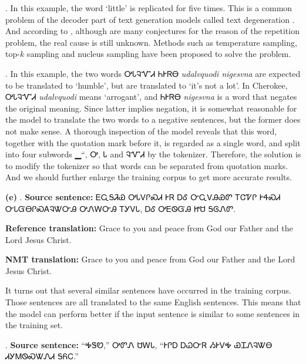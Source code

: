 \documentclass[a4paper,12pt]{report}
\newcommand{\cherokeefam}[1]{{\cherokeefama #1}}
\newcommand{\japanesefam}[1]{{\japanesefama #1}}
\newcommand{\rom}[1]{\expandafter{\romannumeral #1\relax}}
\begin{document}
\rom{2}. In this example, the word `little' is replicated for five times. This is a common problem of the decoder part of text generation models called text degeneration \cite{degeneration}. And according to \citeauthor{repitition} \cite{repitition}, although are many conjectures for the reason of the repetition problem, the real cause is still unknown. Methods such as temperature sampling, top-$k$ sampling and nucleus sampling have been proposed to solve the problem.

\rom{3}. In this example, the two words \cherokeefam{ᎤᏓᎸᏉᏗ ᏂᎨᏒᎾ} \textit{udalvquodi nigesvna} are expected to be translated to `humble', but are translated to `it's not a lot'. In Cherokee, \cherokeefam{ᎤᏓᎸᏉᏗ} \textit{udalvquodi} means `arrogant', and \cherokeefam{ᏂᎨᏒᎾ} \textit{nigesvna} is a word that negates the original meaning. Since latter implies negation, it is somewhat reasonable for the model to translate the two words to a negative sentences, but the former does not make sense. A thorough inspection of the model reveals that this word, together with the quotation mark before it, is regarded as a single word, and split into four subwords \japanesefam{▁}``, \cherokeefam{Ꭴ}, \cherokeefam{Ꮣ} and \cherokeefam{ᎸᏉᏗ} by the tokenizer. Therefore, the solution is to modify the tokenizer so that words can be separated from quotation marks. And we should further enlarge the training corpus to get more accurate results.

\textbf{(e)} \rom{1}. \textbf{Source sentence:} \cherokeefam{ᎬᏩᎦᏘᏯ ᎤᏓᏙᎵᏍᏗ ᎨᏒ ᎠᎴ ᏅᏩᏙᎯᏯᏛ ᎢᏣᏤᎵ ᎨᏎᏍᏗ Ꮕ{\allowbreak}Ꮣ{\allowbreak}Ᏻ{\allowbreak}Ꮎ{\allowbreak}Ꮅ{\allowbreak}Ꮝ{\allowbreak}Ꭺ{\allowbreak}Ꮈ{\allowbreak}Ꮤ{\allowbreak}Ꮕ{\allowbreak}Ꭿ ᎤᏁᎳᏅᎯ ᎢᎩᏙᏓ, ᎠᎴ ᎤᎬᏫᏳᎯ ᏥᏌ ᎦᎶᏁᏛ.}

\vspace{-.75em}

\textbf{Reference translation:} Grace to you and peace from God our Father and the Lord Jesus Christ.

\vspace{-.75em}

\textbf{NMT translation:} Grace to you and peace from God our Father and the Lord Jesus Christ.

It turns out that several similar sentences have occurred in the training corpus. Those sentences are all translated to the same English sentences. This means that the model can perform better if the input sentence is similar to some sentences in the training set.

\rom{2}. \textbf{Source sentence:} \cherokeefam{“ᎭᏕᏬ,” ᎤᏛᏁ ᏌᎳᏓ, “ᎨᎵᎠ ᎠᏇᏅᏒ ᏱᎨᏙᎭ ᏯᏆᏁᎸᏔᎾ Ꮧ{\allowbreak}Ꭹ{\allowbreak}Ꮇ{\allowbreak}Ꮻ{\allowbreak}Ꮝ{\allowbreak}Ꮤ{\allowbreak}Ꮑ{\allowbreak}Ꮧ ᎦᏲᏟ.”}
\end{document}
